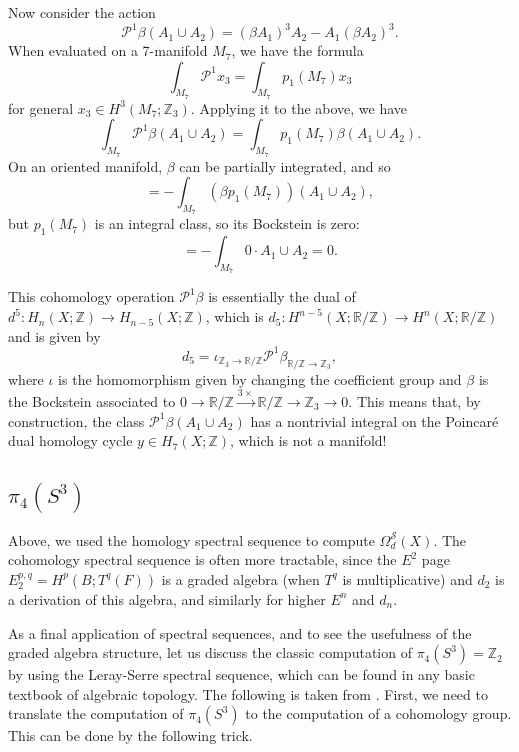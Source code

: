 \documentclass[12pt]{article}
\numberwithin{equation}{section}
\numberwithin{figure}{section}
\theoremstyle{remark}
\def\bR{\mathbb{R}}
\def\bZ{\mathbb{Z}}
\def\cP{\mathcal{P}}
\def\cS{\mathcal{S}}
\begin{document}
Now consider the action \begin{equation}
\cP^1 \beta (A_1 \cup A_2) 
= (\beta A_1)^3 A_2 - A_1 (\beta A_2)^3.
\end{equation} 
When evaluated on a 7-manifold $M_7$, we have the formula \begin{equation}
\int_{M_7} \cP^1 x_3 = \int_{M_7} p_1(M_7) x_3
\end{equation} for general $x_3\in H^3(M_7;\bZ_3)$. Applying it to the above, we have \begin{equation}
\int_{M_7} \cP^1 \beta(A_1\cup A_2) = \int_{M_7} p_1(M_7) \beta(A_1\cup A_2).
\end{equation}
On an oriented manifold, $\beta$ can be partially integrated, and so \begin{equation}
= -\int_{M_7} (\beta p_1(M_7) ) (A_1\cup A_2),
\end{equation} but $p_1(M_7)$ is an integral class, so its Bockstein is zero: \begin{equation}
= -\int_{M_7} 0\cdot A_1\cup A_2 = 0.
\end{equation}


This cohomology operation $\cP^1\beta$ is essentially the dual of $d^5: H_n(X;\bZ)\to H_{n-5}(X;\bZ)$,
which is $d_5:H^{n-5}(X;\bR/\bZ)\to H^{n}(X;\bR/\bZ)$ and is given by \begin{equation}
d_5 = \iota_{\bZ_3\to \bR/\bZ}\cP^1 \beta_{\bR/\bZ\to\bZ_3},
\end{equation} where $\iota$ is the homomorphism given by changing the coefficient group
and $\beta$ is the Bockstein associated to $ 0\to \bR/\bZ \xrightarrow{3\times} \bR/\bZ\to \bZ_3\to 0$.
This means that, by construction, the class $\cP^1\beta(A_1\cup A_2)$ has a nontrivial  integral
on the Poincar\'e dual homology cycle $y\in H_7(X;\bZ)$, which is not a manifold!

\subsection{$\pi_4(S^3)$}

Above, we used the homology spectral sequence to compute $\Omega^\cS_d(X)$.
The cohomology spectral sequence is often more tractable,
since the $E^2$ page $E_2^{p,q} = H^p(B;T^q(F))$ is a graded algebra (when $T^q$ is multiplicative)
and $d_2$ is a derivation of this algebra,
and similarly for higher $E^n$ and $d_n$.

As a final application of spectral sequences, and to see the usefulness of the graded algebra structure,
let us discuss the classic computation of $\pi_4(S^3)=\bZ_2$ by using the Leray-Serre spectral sequence,
which can be found in any basic textbook of algebraic topology.
The following is taken from \cite[Appendix B]{Saito:2025idl}.
First, we need to translate the computation of $\pi_4(S^3)$ 
to the computation of a cohomology group. This can be done by the following trick.
\end{document}
